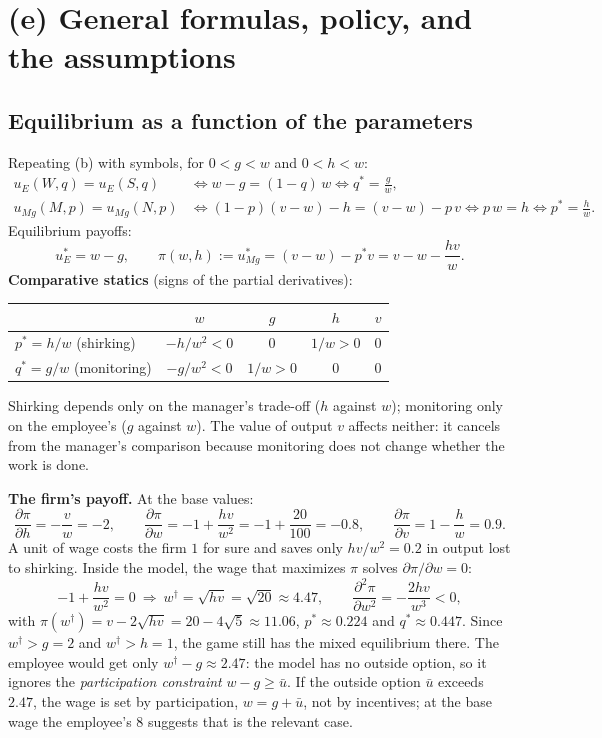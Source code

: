 \documentclass[11pt,a4paper]{article}
\begin{document}
\section*{(e) General formulas, policy, and the assumptions}

\subsection*{Equilibrium as a function of the parameters}

Repeating (b) with symbols, for $0 < g < w$ and $0 < h < w$:
\begin{align*}
  u_E(W, q) = u_E(S, q) &\iff w - g = (1 - q)\,w \iff q^* = \frac{g}{w},\\
  u_{M\!g}(M, p) = u_{M\!g}(N, p) &\iff (1 - p)(v - w) - h = (v - w) - p\,v \iff p\,w = h
  \iff p^* = \frac{h}{w}.
\end{align*}
Equilibrium payoffs:
\[
  u_E^* = w - g, \qquad
  \pi(w, h) := u_{M\!g}^* = (v - w) - p^* v = v - w - \frac{h v}{w}.
\]
\textbf{Comparative statics} (signs of the partial derivatives):
\begin{center}
\begin{tabular}{l|cccc}
 & $w$ & $g$ & $h$ & $v$ \\ \midrule
$p^* = h/w$ (shirking) & $-h/w^2 < 0$ & $0$ & $1/w > 0$ & $0$ \\
$q^* = g/w$ (monitoring) & $-g/w^2 < 0$ & $1/w > 0$ & $0$ & $0$
\end{tabular}
\end{center}
Shirking depends only on the manager's trade-off ($h$ against $w$); monitoring only on the employee's
($g$ against $w$). The value of output $v$ affects neither: it cancels from the manager's comparison
because monitoring does not change whether the work is done.

\textbf{The firm's payoff.} At the base values:
\[
  \frac{\partial \pi}{\partial h} = -\frac{v}{w} = -2, \qquad
  \frac{\partial \pi}{\partial w} = -1 + \frac{h v}{w^2} = -1 + \frac{20}{100} = -0.8, \qquad
  \frac{\partial \pi}{\partial v} = 1 - \frac{h}{w} = 0.9.
\]
A unit of wage costs the firm $1$ for sure and saves only $hv/w^2 = 0.2$ in output lost to shirking.
Inside the model, the wage that maximizes $\pi$ solves $\partial\pi/\partial w = 0$:
\[
  -1 + \frac{h v}{w^2} = 0 \ \Longrightarrow\ w^\dagger = \sqrt{h v} = \sqrt{20} \approx 4.47,
  \qquad \frac{\partial^2 \pi}{\partial w^2} = -\frac{2 h v}{w^3} < 0,
\]
with $\pi(w^\dagger) = v - 2\sqrt{hv} = 20 - 4\sqrt5 \approx 11.06$, $p^* \approx 0.224$ and
$q^* \approx 0.447$. Since $w^\dagger > g = 2$ and $w^\dagger > h = 1$, the game still has the mixed
equilibrium there. The employee would get only $w^\dagger - g \approx 2.47$: the model has no outside
option, so it ignores the \emph{participation constraint} $w - g \ge \bar u$. If the outside option
$\bar u$ exceeds $2.47$, the wage is set by participation, $w = g + \bar u$, not by incentives; at the
base wage the employee's 8 suggests that is the relevant case.
\end{document}
